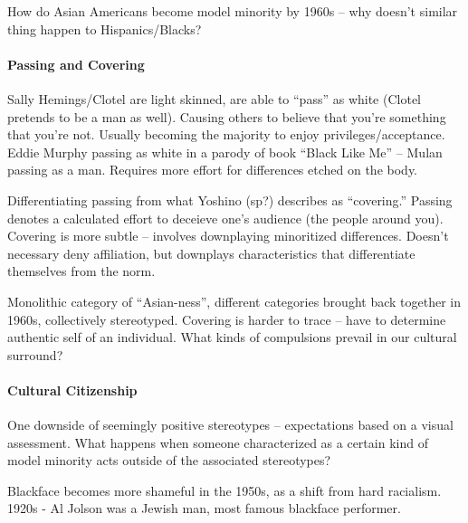 How do Asian Americans become model minority by 1960s -- why doesn't similar thing happen to Hispanics/Blacks?

\paragraph{Passing and Covering} Sally Hemings/Clotel are light skinned, are able to ``pass'' as white (Clotel pretends to be a man as well). Causing others to believe that you're something that you're not. Usually becoming the majority to enjoy privileges/acceptance. Eddie Murphy passing as white in a parody of book ``Black Like Me'' -- Mulan passing as a man. Requires more effort for differences etched on the body.

Differentiating passing from what Yoshino (sp?) describes as ``covering.'' Passing denotes a calculated effort to deceieve one's audience (the people around you). Covering is more subtle -- involves downplaying minoritized differences. Doesn't necessary deny affiliation, but downplays characteristics that differentiate themselves from the norm.

Monolithic category of ``Asian-ness'', different categories brought back together in 1960s, collectively stereotyped. Covering is harder to trace -- have to determine authentic self of an individual. What kinds of compulsions prevail in our cultural surround?

\paragraph{Cultural Citizenship} One downside of seemingly positive stereotypes -- expectations based on a visual assessment. What happens when someone characterized as a certain kind of model minority acts outside of the associated stereotypes?

Blackface becomes more shameful in the 1950s, as a shift from hard racialism. 1920s - Al Jolson was a Jewish man, most famous blackface performer.